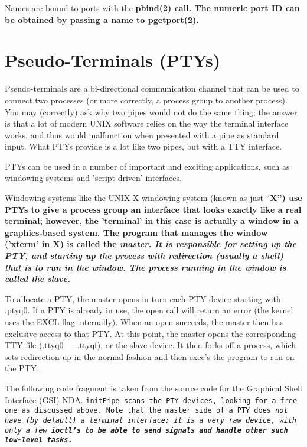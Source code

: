 \documentclass{report}
\begin{document}
Names are bound to ports with the \bf pbind\rm(2) call.
The numeric port ID can be obtained by passing a name to
\bf pgetport\rm(2).

\section{Pseudo-Terminals (PTYs)}

Pseudo-terminals are a bi-directional
communication channel that can be used to connect two processes
(or more correctly, a process group to another process). You may
(correctly) ask why two pipes would not do the same thing; the
answer is that a lot of modern UNIX software relies on the way
the terminal interface works, and thus would malfunction when
presented with a pipe as standard input. What PTYs provide is a
lot like two pipes, but with a TTY interface.

PTYs can be used in a number of important
and exciting applications, such as windowing systems and
'script-driven' interfaces.

Windowing systems like the UNIX X windowing system (known as just
``\bf X\rm'')
use PTYs to give a process group an interface that looks exactly
like a real terminal; however, the 'terminal' in this case is
actually a window in a graphics-based system. The program that
manages the window ('xterm' in \bf X\rm) is called the \it master\rm.
It is responsible for setting up the PTY, and starting up the
process with redirection (usually a shell) that is to run in the
window. The process running in the window is called the \it slave\rm.

To allocate a PTY, the master opens in turn
each PTY device starting with
.ptyq0. If a PTY is already in use,
the open call will return an error (the kernel uses the EXCL flag
internally). When an open succeeds, the master then has exclusive
access to that PTY. At this point, the master opens the
corresponding TTY file 
(.ttyq0 --- .ttyqf), or the slave device. It
then forks off a process, which sets redirection up in the normal
fashion and then exec's the program to run on the PTY.

The following code fragment is taken from the source code for the
Graphical Shell Interface (GSI) NDA.
\tt initPipe \rm
scans the PTY devices, looking for a free one as
discussed above. Note that the master side of a PTY does \em not \rm
have (by default) a terminal interface; it is a very raw device,
with only a few \bf ioctl\rm's to be able to send signals and handle
other such low-level tasks.
\end{document}
